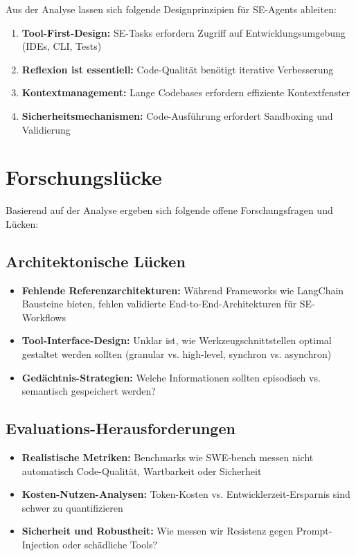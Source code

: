 Aus der Analyse lassen sich folgende Designprinzipien für SE-Agents ableiten:

\begin{enumerate}
  \item \textbf{Tool-First-Design:} SE-Tasks erfordern Zugriff auf Entwicklungsumgebung (IDEs, CLI, Tests)
  \item \textbf{Reflexion ist essentiell:} Code-Qualität benötigt iterative Verbesserung
  \item \textbf{Kontextmanagement:} Lange Codebases erfordern effiziente Kontextfenster
  \item \textbf{Sicherheitsmechanismen:} Code-Ausführung erfordert Sandboxing und Validierung
\end{enumerate}

\section{Forschungslücke}

Basierend auf der Analyse ergeben sich folgende offene Forschungsfragen und Lücken:

\subsection{Architektonische Lücken}

\begin{itemize}
  \item \textbf{Fehlende Referenzarchitekturen:} Während Frameworks wie LangChain Bausteine bieten, fehlen validierte End-to-End-Architekturen für SE-Workflows
  \item \textbf{Tool-Interface-Design:} Unklar ist, wie Werkzeugschnittstellen optimal gestaltet werden sollten (granular vs. high-level, synchron vs. asynchron)
  \item \textbf{Gedächtnis-Strategien:} Welche Informationen sollten episodisch vs. semantisch gespeichert werden?
\end{itemize}

\subsection{Evaluations-Herausforderungen}

\begin{itemize}
  \item \textbf{Realistische Metriken:} Benchmarks wie SWE-bench messen nicht automatisch Code-Qualität, Wartbarkeit oder Sicherheit
  \item \textbf{Kosten-Nutzen-Analysen:} Token-Kosten vs. Entwicklerzeit-Ersparnis sind schwer zu quantifizieren
  \item \textbf{Sicherheit und Robustheit:} Wie messen wir Resistenz gegen Prompt-Injection oder schädliche Tools?
\end{itemize}

